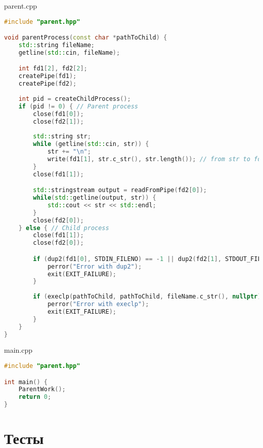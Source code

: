 \documentclass[a4paper, 12pt]{article}
\begin{document}
parent.cpp
\begin{lstlisting}[language=C++]
#include "parent.hpp"

void parentProcess(const char *pathToChild) {
    std::string fileName;
    getline(std::cin, fileName);

    int fd1[2], fd2[2];
    createPipe(fd1);
    createPipe(fd2);
    
    int pid = createChildProcess();
    if (pid != 0) { // Parent process
        close(fd1[0]);
        close(fd2[1]);
        
        std::string str;
        while (getline(std::cin, str)) {
            str += "\n";
            write(fd1[1], str.c_str(), str.length()); // from str to fd1[1]
        }
        close(fd1[1]);

        std::stringstream output = readFromPipe(fd2[0]);
        while(std::getline(output, str)) {
            std::cout << str << std::endl;
        }
        close(fd2[0]);
    } else { // Child process
        close(fd1[1]);
        close(fd2[0]);

        if (dup2(fd1[0], STDIN_FILENO) == -1 || dup2(fd2[1], STDOUT_FILENO) == -1) {
            perror("Error with dup2");
            exit(EXIT_FAILURE);
        }
        
        if (execlp(pathToChild, pathToChild, fileName.c_str(), nullptr) == -1) { // to child.cpp
            perror("Error with execlp");
            exit(EXIT_FAILURE);
        } 
    }
}
\end{lstlisting}

main.cpp
\begin{lstlisting}[language=C++]
#include "parent.hpp"

int main() {
    ParentWork();
    return 0;
}
\end{lstlisting}

\newpage
\section{Тесты}
\end{document}
